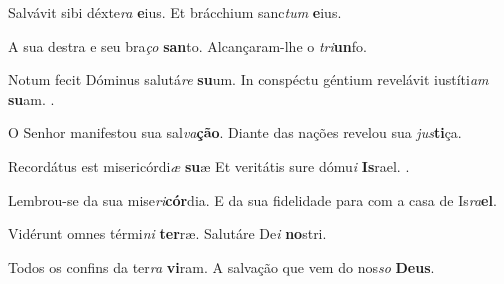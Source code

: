 \begin{greenumerate}
  \setcounter{enumi}{1}


  \item Salvávit sibi déxte\textit{ra} \textbf{e}ius.  {\GreStar} Et brácchium sanc\textit{tum} \textbf{e}ius. 

  \switchcolumn\setcounter{enumi}{1}

  \item A sua destra e seu bra\textit{ço} \textbf{san}to.  {\GreStar} Alcança\-ram-lhe o \textit{tri}\textbf{un}fo. 

  \switchcolumn*


  \item Notum fecit Dóminus salutá\textit{re} \textbf{su}um.  {\GreStar} In conspéctu géntium revelávit iustíti\textit{am} \textbf{su}am. .

  \switchcolumn%

  \item O Senhor manifestou sua sal\textit{va}\textbf{ção}.  {\GreStar} Diante das nações revelou sua \textit{jus}\textbf{ti}ça. 

  \switchcolumn*


  \item Recordátus est misericórdi\textit{æ} \textbf{su}æ  {\GreStar} Et veritátis sure dómu\textit{i} \textbf{Is}rael. .

  \switchcolumn%

  \item Lembrou-se da sua mise\textit{ri}\textbf{cór}dia.  {\GreStar} E da sua fidelidade para com a casa de Is\textit{ra}\textbf{el}. 

  \switchcolumn*


  \item Vidérunt omnes térmi\textit{ni} \textbf{ter}ræ.  {\GreStar} Salutáre De\textit{i} \textbf{no}stri. 

  \switchcolumn%

  \item Todos os confins da ter\textit{ra} \textbf{vi}ram.  {\GreStar} A salvação que vem do nos\textit{so} \textbf{Deus}. 


\end{greenumerate}

